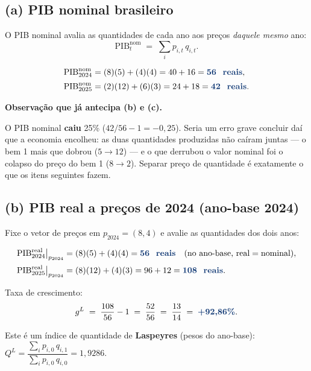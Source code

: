 \documentclass[11pt, a4paper]{article}
\newcommand{\passo}[1]{\medskip\noindent\textbf{#1}\par\nobreak}
\newcommand{\resp}[1]{\textcolor{darkblue}{\textbf{#1}}}
\begin{document}
\subsection*{(a) PIB nominal brasileiro}

O PIB nominal avalia as quantidades de cada ano aos preços \emph{daquele mesmo} ano:
$$\text{PIB}^{\text{nom}}_t \;=\; \sum_i p_{i,t}\, q_{i,t}.$$

\begin{align*}
\text{PIB}^{\text{nom}}_{2024} &= (8)(5) + (4)(4) = 40 + 16 = \resp{56 \text{ reais}},\\[2pt]
\text{PIB}^{\text{nom}}_{2025} &= (2)(12) + (6)(3) = 24 + 18 = \resp{42 \text{ reais}}.
\end{align*}

\passo{Observação que já antecipa (b) e (c).} O PIB nominal \textbf{caiu} 25\%
($42/56 - 1 = -0{,}25$). Seria um erro grave concluir daí que a economia encolheu: as
duas quantidades produzidas não caíram juntas --- o bem 1 mais que dobrou
($5 \to 12$) --- e o que derrubou o valor nominal foi o colapso do preço do bem 1
($8 \to 2$). Separar preço de quantidade é exatamente o que os itens seguintes fazem.

\subsection*{(b) PIB real a preços de 2024 (ano-base 2024)}

Fixe o vetor de preços em $p_{2024} = (8,4)$ e avalie as quantidades dos dois anos:

\begin{align*}
\text{PIB}^{\text{real}}_{2024}\big|_{p_{2024}} &= (8)(5) + (4)(4) = \resp{56 \text{ reais}}
  \quad (\text{no ano-base, real} = \text{nominal}),\\[2pt]
\text{PIB}^{\text{real}}_{2025}\big|_{p_{2024}} &= (8)(12) + (4)(3) = 96 + 12 = \resp{108 \text{ reais}}.
\end{align*}

Taxa de crescimento:
$$g^{L} \;=\; \frac{108}{56} - 1 \;=\; \frac{52}{56} \;=\; \frac{13}{14} \;=\;
\resp{+92{,}86\%}.$$

Este é um índice de quantidade de \textbf{Laspeyres} (pesos do ano-base):
$Q^{L} = \dfrac{\sum_i p_{i,0}\, q_{i,1}}{\sum_i p_{i,0}\, q_{i,0}} = 1{,}9286$.

\end{document}
